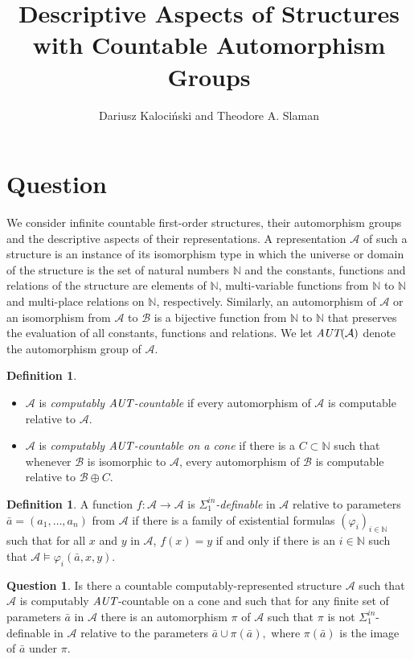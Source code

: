 \documentclass[12pt,fullpage]{article}
\theoremstyle{definition}
\newtheorem{question}[theorem]{Question}
\newtheorem{definition}[theorem]{Definition}
\theoremstyle{remark}
\newcommand{\A}{\mathcal{A}}
\newcommand{\B}{\mathcal{B}}
\renewcommand{\phi}{\varphi}
\newcommand{\N}{\mathbb{N}}
\newcommand{\AUT}{\mbox{\it AUT}}
\begin{document}
\title{Descriptive Aspects of Structures with Countable Automorphism Groups}
\author{Dariusz Kalociński and  Theodore A. Slaman}
 
\maketitle

\section{Question}

We consider infinite countable first-order structures, their automorphism groups and the descriptive aspects of their representations. A representation $\A$ of such a structure is an instance of its isomorphism type in which the universe or domain of the structure is the set of natural numbers $\N$ and the constants, functions and relations of the structure are elements of $\N$, multi-variable functions from $\N$ to $\N$ and multi-place relations on $\N$, respectively.   Similarly, an automorphism of $\A$ or an isomorphism from $\A$ to $\B$ is a bijective function from $\N$ to $\N$ that preserves the evaluation of all constants, functions and relations.  We let $\AUT(\A)$ denote the automorphism group of $\A$.


\begin{definition}\label{1.1}
  \begin{itemize}
  \item     $\A$ is \emph{computably $\AUT$-countable} if every automorphism of $\A$ is computable relative to $\A$.  
  \item  $\A$ is \emph{computably $\AUT$-countable on a cone} if there is a $C\subset\N$ such that whenever $\B$ is isomorphic to $\A$, every automorphism of $\B$ is computable relative to $\B\oplus C$.
  \end{itemize}
\end{definition}

\begin{definition}
  A function $f:\A\to\A$ is \emph{$\Sigma^{in}_1$-definable} in $\A$ relative to parameters
  $\bar{a}=(a_1,\dots,a_n)$ from $\A$ if there is a family of existential formulas $(\phi_i)_{i\in\N}$ such that for all $x$ and $y$ in $\A$, $f(x)=y$ if and only if there is an $i\in\N$ such that $\A\models\phi_i(\bar{a},x,y)$.
\end{definition}

\begin{question}\label{sec:question}\label{1.2}
  Is there a countable computably-represented structure $\A$ such that $\A$ is computably $\AUT$-countable on a cone and such that for any finite  set of parameters $\bar{a}$ in $\A$ there is an automorphism $\pi$ of $\A$ such that $\pi$ is not $\Sigma^{in}_1$-definable in $\A$ relative to the parameters $\bar{a}\cup \pi(\bar{a}),$ where $\pi(\bar{a})$ is the image of $\bar{a}$ under $\pi$.
\end{question}
\end{document}
